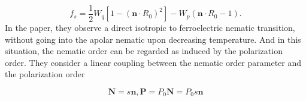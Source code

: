 \documentclass{article}
\begin{document}
\begin{dmath}
    f_s = \frac{1}{2}W_{q}\left[1- (\mathbf{n}\cdot R_{0})^2\right] - W_{p}(\mathbf{n}\cdot R_{0}-1).
\end{dmath}
In the paper, they observe a direct isotropic to ferroelectric nematic transition, without going into the apolar nematic upon decreasing temperature. And in this situation, the nematic order can be regarded as induced by the polarization order.
They consider a linear coupling between the nematic order parameter and the polarization order

\begin{equation}
    \mathbf{N}=s\mathbf{n}, \mathbf{P} = P_{0}\mathbf{N}=P_{0}s\mathbf{n}
\end{equation}



\end{document}
